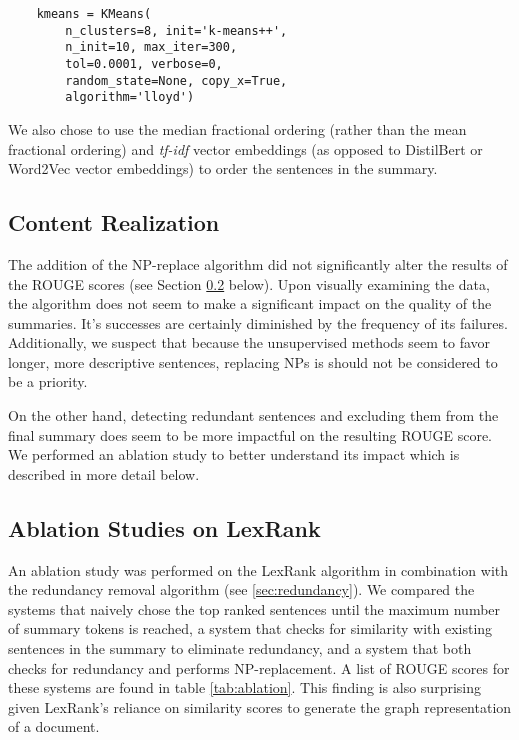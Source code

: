 \begin{verbatim}
    kmeans = KMeans(
        n_clusters=8, init='k-means++', 
        n_init=10, max_iter=300, 
        tol=0.0001, verbose=0, 
        random_state=None, copy_x=True, 
        algorithm='lloyd')
\end{verbatim}

We also chose to use the median fractional ordering (rather than the mean fractional ordering) and \textit{tf-idf} vector embeddings (as opposed to DistilBert or Word2Vec vector embeddings) to order the sentences in the summary.

\subsection{Content Realization}

The addition of the NP-replace algorithm did not significantly alter the results of the ROUGE scores (see Section \ref{section::ablation} below). Upon visually examining the data, the algorithm does not seem to make a significant impact on the quality of the summaries. It's successes are certainly diminished by the frequency of its failures. Additionally, we suspect that because the unsupervised methods seem to favor longer, more descriptive sentences, replacing NPs is should not be considered to be a priority.

On the other hand, detecting redundant sentences and excluding them from the final summary does seem to be more impactful on the resulting ROUGE score. We performed an ablation study to better understand its impact which is described in more detail below.

\subsection{Ablation Studies on LexRank}\label{section::ablation}

An ablation study was performed on the LexRank algorithm in combination with the redundancy removal algorithm (see \ref{sec:redundancy}). We compared the systems that naively chose the top ranked sentences until the maximum number of summary tokens is reached, a system that checks for similarity with existing sentences in the summary to eliminate redundancy, and a system that both checks for redundancy and performs NP-replacement. A list of ROUGE scores for these systems are found in table \ref{tab:ablation}. This finding is also surprising given LexRank's reliance on similarity scores to generate the graph representation of a document.

